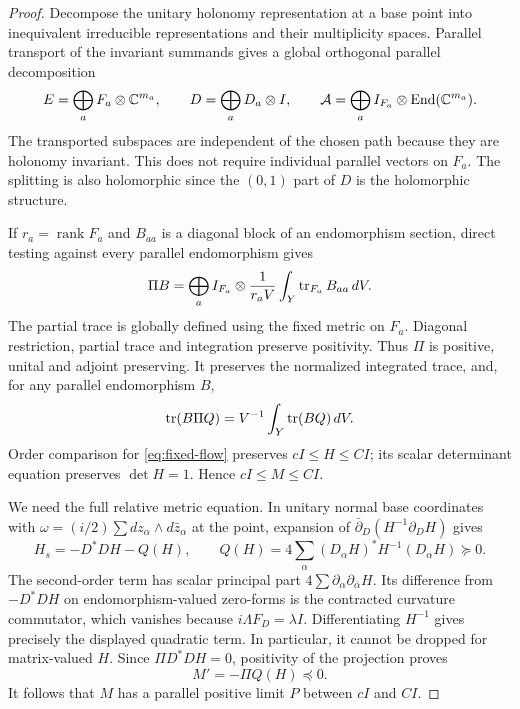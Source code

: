 \begin{proof}
Decompose the unitary holonomy representation at a base point into
inequivalent irreducible representations and their multiplicity spaces.
Parallel transport of the invariant summands gives a global orthogonal
parallel decomposition
\begin{equation}\label{eq:holonomy-splitting}
 E=\bigoplus_a F_a\otimes\mathbb C^{m_a},\qquad
 D=\bigoplus_a D_a\otimes I,
 \qquad \mathcal A=\bigoplus_a I_{F_a}\otimes\operatorname{End}(\mathbb C^{m_a}).
\end{equation}
The transported subspaces are independent of the chosen path because
they are holonomy invariant. This does not require individual parallel
vectors on $F_a$. The splitting is also holomorphic since the
$(0,1)$ part of $D$ is the holomorphic structure.

If $r_a=\operatorname{rank}F_a$ and $B_{aa}$ is a diagonal block of
an endomorphism section, direct testing against every parallel
endomorphism gives
\begin{equation}\label{eq:parallel-projection}
 \Pi B=\bigoplus_a I_{F_a}\otimes
       \frac1{r_aV}\int_Y\operatorname{tr}_{F_a}B_{aa}\,dV.
\end{equation}
The partial trace is globally defined using the fixed metric on $F_a$.
Diagonal restriction, partial trace and integration preserve positivity.
Thus $\Pi$ is positive, unital and adjoint preserving. It preserves the
normalized integrated trace, and, for any parallel endomorphism $B$,
\begin{equation}\label{eq:projection-trace}
 \operatorname{tr}(B\Pi Q)=V^{-1}\int_Y\operatorname{tr}(BQ)\,dV.
\end{equation}
Order comparison for \eqref{eq:fixed-flow} preserves $cI\le H\le CI$;
its scalar determinant equation preserves $\det H=1$. Hence
$cI\le M\le CI$.

We need the full relative metric equation. In unitary normal base
coordinates with $\omega=(i/2)\sum dz_\alpha\wedge d\bar z_\alpha$
at the point, expansion of $\bar\partial_D(H^{-1}\partial_DH)$ gives
\begin{equation}\label{eq:relative-fixed-equation}
 H_s=-D^*DH-Q(H),\qquad
 Q(H)=4\sum_\alpha(D_\alpha H)^*H^{-1}(D_\alpha H)\succeq0.
\end{equation}
The second-order term has scalar principal part
$4\sum\partial_\alpha\partial_{\bar\alpha}H$. Its difference from
$-D^*DH$ on endomorphism-valued zero-forms is the contracted curvature
commutator, which vanishes because $i\Lambda F_D=\lambda I$.
Differentiating $H^{-1}$ gives precisely the displayed quadratic term.
In particular, it cannot be dropped for matrix-valued $H$.
Since $\Pi D^*DH=0$, positivity of the projection proves
\begin{equation}\label{eq:monotone-mean}
 M'=-\Pi Q(H)\preceq0.
\end{equation}
It follows that $M$ has a parallel positive limit $P$ between $cI$ and $CI$.


\end{proof}
